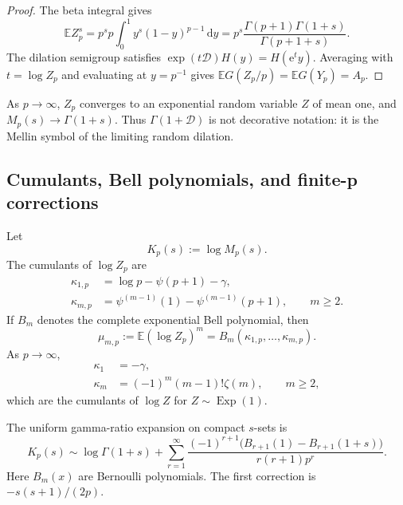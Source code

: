 \documentclass[11pt,oneside]{article}
\numberwithin{equation}{section}
\theoremstyle{plain}
\theoremstyle{definition}
\theoremstyle{remark}
\newcommand{\e}{\mathrm e}
\newcommand{\dd}{\,\mathrm d}
\newcommand{\E}{\mathbb E}
\newcommand{\Dop}{\mathscr D}
\begin{document}
\begin{proof}
The beta integral gives
\[
 \E Z_p^s=p^s p\int_0^1y^s(1-y)^{p-1}\dd y
 =p^s\frac{\Gamma(p+1)\Gamma(1+s)}{\Gamma(p+1+s)}.
\]
The dilation semigroup satisfies $\exp(t\Dop)H(y)=H(\e^t y)$.  Averaging with
\(t=\log Z_p\) and evaluating at $y=p^{-1}$ gives
$\E G(Z_p/p)=\E G(Y_p)=A_p$.
\end{proof}

As $p\to\infty$, $Z_p$ converges to an exponential random variable $Z$ of mean one, and
$M_p(s)\to\Gamma(1+s)$.  Thus $\Gamma(1+\Dop)$ is not decorative notation: it is the Mellin
symbol of the limiting random dilation.

\subsection{Cumulants, Bell polynomials, and finite-p corrections}

Let
\begin{equation}
 K_p(s):=\log M_p(s).
 \label{eq:Kp}
\end{equation}
The cumulants of $\log Z_p$ are
\begin{align}
 \kappa_{1,p}&=\log p-\psi(p+1)-\gamma,
 \label{eq:kappa1p}\\
 \kappa_{m,p}&=\psi^{(m-1)}(1)-\psi^{(m-1)}(p+1),
 \qquad m\geq2.
 \label{eq:kappamp}
\end{align}
If $B_m$ denotes the complete exponential Bell polynomial, then
\begin{equation}
 \mu_{m,p}:=\E(\log Z_p)^m
 =B_m(\kappa_{1,p},\ldots,\kappa_{m,p}).
 \label{eq:log-moments-Bell}
\end{equation}
As $p\to\infty$,
\begin{align}
 \kappa_1&=-\gamma,\label{eq:kappa-limit-1}\\
 \kappa_m&=(-1)^m(m-1)!\zeta(m),\qquad m\geq2,
 \label{eq:kappa-limit-m}
\end{align}
which are the cumulants of $\log Z$ for $Z\sim\operatorname{Exp}(1)$.

The uniform gamma-ratio expansion on compact $s$-sets is
\begin{equation}
 \boxed{
 K_p(s)\sim\log\Gamma(1+s)
 +\sum_{r=1}^{\infty}
 \frac{(-1)^{r+1}\bigl(B_{r+1}(1)-B_{r+1}(1+s)\bigr)}
 {r(r+1)p^r}.}
 \label{eq:Bernoulli-gamma-ratio}
\end{equation}
Here $B_m(x)$ are Bernoulli polynomials.  The first correction is
$-s(s+1)/(2p)$.
\end{document}
